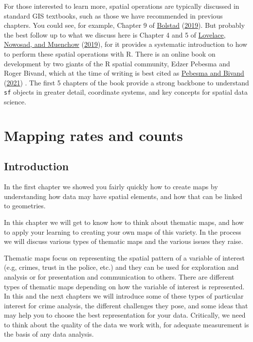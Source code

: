 \documentclass[
]{book}
\begin{document}
For those interested to learn more, spatial operations are typically discussed in standard GIS textbooks, such as those we have recommended in previous chapters. You could see, for example, Chapter 9 of \protect\hyperlink{ref-Bolstad_2019}{Bolstad} (\protect\hyperlink{ref-Bolstad_2019}{2019}). But probably the best follow up to what we discuss here is Chapter 4 and 5 of \protect\hyperlink{ref-Lovelace_2019}{Lovelace, Nowosad, and Muenchow} (\protect\hyperlink{ref-Lovelace_2019}{2019}), for it provides a systematic introduction to how to perform these spatial operations with R. There is an online book on development by two giants of the R spatial community, Edzer Pebesma and Roger Bivand, which at the time of writing is best cited as \protect\hyperlink{ref-Pebesma_2021}{Pebesma and Bivand} (\protect\hyperlink{ref-Pebesma_2021}{2021}) . The first 5 chapters of the book provide a strong backbone to understand \texttt{sf} objects in greater detail, coordinate systems, and key concepts for spatial data science.

\hypertarget{mapping-rates-and-counts}{%
\chapter{Mapping rates and counts}\label{mapping-rates-and-counts}}

\hypertarget{introduction-2}{%
\section{Introduction}\label{introduction-2}}

In the first chapter we showed you fairly quickly how to create maps by understanding how data may have spatial elements, and how that can be linked to geometries.

In this chapter we will get to know how to think about thematic maps, and how to apply your learning to creating your own maps of this variety. In the process we will discuss various types of thematic maps and the various issues they raise.

Thematic maps focus on representing the spatial pattern of a variable of interest (e.g, crimes, trust in the police, etc.) and they can be used for exploration and analysis or for presentation and communication to others. There are different types of thematic maps depending on how the variable of interest is represented. In this and the next chapters we will introduce some of these types of particular interest for crime analysis, the different challenges they pose, and some ideas that may help you to choose the best representation for your data. Critically, we need to think about the quality of the data we work with, for adequate measurement is the basis of any data analysis.
\end{document}
